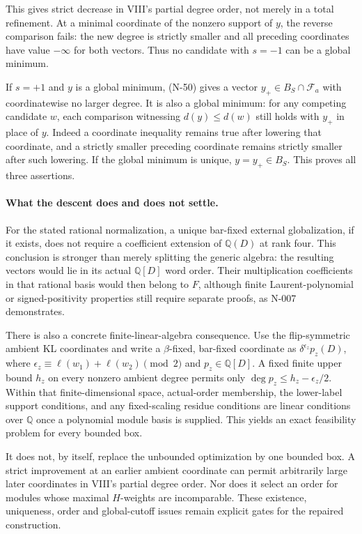 This gives strict decrease in VIII's partial degree order,
not merely in a total refinement.  At a minimal coordinate
of the nonzero support of $y$, the reverse comparison fails:
the new degree is strictly smaller and all preceding
coordinates have value $-\infty$ for both vectors.
Thus no candidate with $s=-1$ can be a global minimum.

If $s=+1$ and $y$ is a global minimum, (N-50) gives a vector
$y_+\in B_S\cap\mathcal F_a$ with coordinatewise no larger
degree.  It is also a global minimum: for any competing
candidate $w$, each comparison witnessing $d(y)\le d(w)$
still holds with $y_+$ in place of $y$.  Indeed a coordinate
inequality remains true after lowering that coordinate, and
a strictly smaller preceding coordinate remains strictly
smaller after such lowering.  If the global minimum is
unique, $y=y_+\in B_S$.  This proves all three assertions.

\paragraph{What the descent does and does not settle.}
For the stated rational normalization, a unique bar-fixed
external globalization, if it exists, does not require a
coefficient extension of $\mathbb Q(D)$ at rank four.
This conclusion is stronger than merely splitting the generic
algebra: the resulting vectors would lie in its actual
$\mathbb Q[D]$ word order.  Their multiplication coefficients
in that rational basis would then belong to $F$, although
finite Laurent-polynomial or signed-positivity properties
still require separate proofs, as N-007 demonstrates.

There is also a concrete finite-linear-algebra consequence.
Use the flip-symmetric ambient KL coordinates and write a
$\beta$-fixed, bar-fixed coordinate as
$\delta^{\epsilon_z}p_z(D)$, where
$\epsilon_z\equiv\ell(w_1)+\ell(w_2)\pmod2$ and
$p_z\in\mathbb Q[D]$.  A fixed finite upper bound $h_z$
on every nonzero ambient degree permits only
$\deg p_z\le h_z-\epsilon_z/2$.  Within that finite-dimensional
space, actual-order membership, the lower-label support
conditions, and any fixed-scaling residue conditions are
linear conditions over $\mathbb Q$ once a polynomial module
basis is supplied.  This yields an exact feasibility problem
for every bounded box.

It does not, by itself, replace the unbounded optimization by
one bounded box.  A strict improvement at an earlier ambient
coordinate can permit arbitrarily large later coordinates in
VIII's partial degree order.  Nor does it select an order for
modules whose maximal $H$-weights are incomparable.  These
existence, uniqueness, order and global-cutoff issues remain
explicit gates for the repaired construction.
